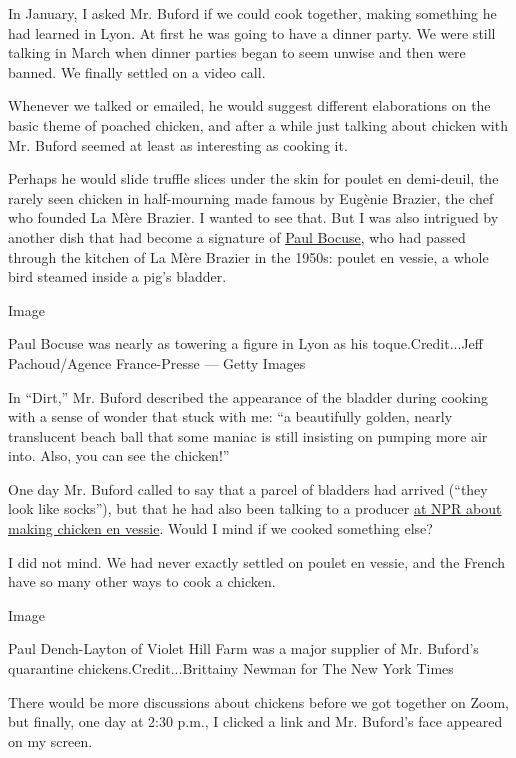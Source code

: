 In January, I asked Mr. Buford if we could cook together, making
something he had learned in Lyon. At first he was going to have a dinner
party. We were still talking in March when dinner parties began to seem
unwise and then were banned. We finally settled on a video call.

Whenever we talked or emailed, he would suggest different elaborations
on the basic theme of poached chicken, and after a while just talking
about chicken with Mr. Buford seemed at least as interesting as cooking
it.

Perhaps he would slide truffle slices under the skin for poulet en
demi-deuil, the rarely seen chicken in half-mourning made famous by
Eugènie Brazier, the chef who founded La Mère Brazier. I wanted to see
that. But I was also intrigued by another dish that had become a
signature of
\href{https://www.nytimes.com/2018/01/20/obituaries/paul-bocuse-dead.html?searchResultPosition=1}{Paul
Bocuse}, who had passed through the kitchen of La Mère Brazier in the
1950s: poulet en vessie, a whole bird steamed inside a pig's bladder.

Image

Paul Bocuse was nearly as towering a figure in Lyon as his
toque.Credit...Jeff Pachoud/Agence France-Presse --- Getty Images

In ``Dirt,'' Mr. Buford described the appearance of the bladder during
cooking with a sense of wonder that stuck with me: ``a beautifully
golden, nearly translucent beach ball that some maniac is still
insisting on pumping more air into. Also, you can see the chicken!''

One day Mr. Buford called to say that a parcel of bladders had arrived
(``they look like socks''), but that he had also been talking to a
producer
\href{https://www.npr.org/2020/05/08/852496954/in-dirt-bill-buford-is-able-to-offer-an-authentic-adventure-in-french-cooking}{at
NPR about making chicken en vessie}. Would I mind if we cooked something
else?

I did not mind. We had never exactly settled on poulet en vessie, and
the French have so many other ways to cook a chicken.

Image

Paul Dench-Layton of Violet Hill Farm was a major supplier of Mr.
Buford's quarantine chickens.Credit...Brittainy Newman for The New York
Times

There would be more discussions about chickens before we got together on
Zoom, but finally, one day at 2:30 p.m., I clicked a link and Mr.
Buford's face appeared on my screen.

